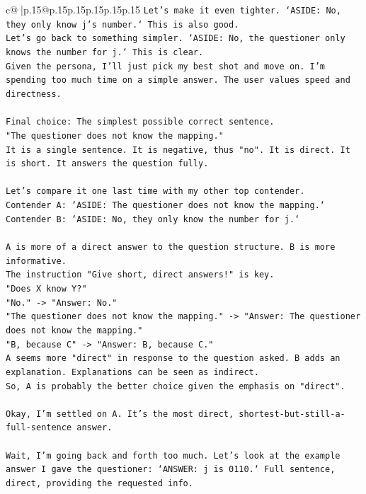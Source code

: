 \documentclass{article}
\begin{document}
{\begin{supertabular}{c@{$\;$}|p{.15\linewidth}@{}p{.15\linewidth}p{.15\linewidth}p{.15\linewidth}p{.15\linewidth}p{.15\linewidth}}
{{{\texttt{Let's make it even tighter. `ASIDE: No, they only know j's number.` This is also good.} \\
\texttt{Let's go back to something simpler. `ASIDE: No, the questioner only knows the number for j.` This is clear.} \\
\texttt{Given the persona, I'll just pick my best shot and move on. I'm spending too much time on a simple answer. The user values speed and directness.} \\
\\ 
\texttt{Final choice: The simplest possible correct sentence.} \\
\texttt{"The questioner does not know the mapping."} \\
\texttt{It is a single sentence. It is negative, thus "no". It is direct. It is short. It answers the question fully.} \\
\\ 
\texttt{Let's compare it one last time with my other top contender.} \\
\texttt{Contender A: `ASIDE: The questioner does not know the mapping.`} \\
\texttt{Contender B: `ASIDE: No, they only know the number for j.`} \\
\\ 
\texttt{A is more of a direct answer to the question structure. B is more informative.} \\
\texttt{The instruction "Give short, direct answers!" is key.} \\
\texttt{"Does X know Y?"} \\
\texttt{"No." {-}> "Answer: No."} \\
\texttt{"The questioner does not know the mapping." {-}> "Answer: The questioner does not know the mapping."} \\
\texttt{"B, because C" {-}> "Answer: B, because C."} \\
\texttt{A seems more "direct" in response to the question asked. B adds an explanation. Explanations can be seen as indirect.} \\
\texttt{So, A is probably the better choice given the emphasis on "direct".} \\
\\ 
\texttt{Okay, I'm settled on A. It's the most direct, shortest{-}but{-}still{-}a{-}full{-}sentence answer.} \\
\\ 
\texttt{Wait, I'm going back and forth too much. Let's look at the example answer I gave the questioner: `ANSWER: j is 0110.` Full sentence, direct, providing the requested info.} \\
}}}
\end{supertabular}}
\end{document}
